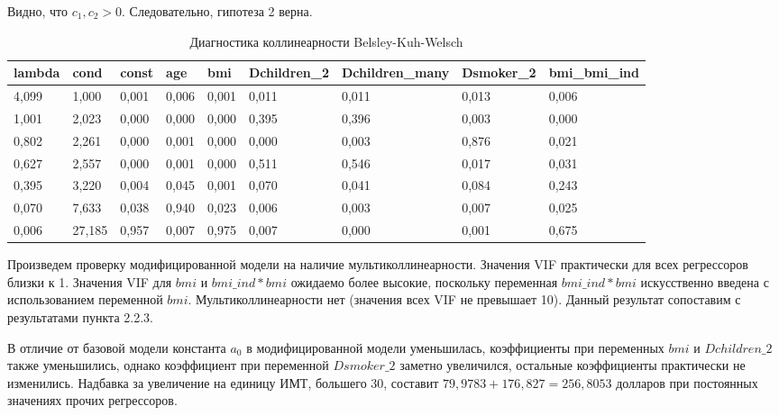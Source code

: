 \documentclass[a4paper,12pt]{article}
\begin{document}
Видно, что $c_1, c_2 >0$. Следовательно, гипотеза 2 верна.

\begin{table}[H]
	\begin{adjustbox}{width=\linewidth}
	\begin{tabular}{|l|l|l|l|l|l|l|l|l|}
		\hline
		lambda & cond   & const & age   & bmi   & Dchildren\_2 & Dchildren\_many & Dsmoker\_2 & bmi\_bmi\_ind \\ \hline
		4,099  & 1,000  & 0,001 & 0,006 & 0,001 & 0,011        & 0,011           & 0,013      & 0,006         \\ \hline
		1,001  & 2,023  & 0,000 & 0,000 & 0,000 & 0,395        & 0,396           & 0,003      & 0,000         \\ \hline
		0,802  & 2,261  & 0,000 & 0,001 & 0,000 & 0,000        & 0,003           & 0,876      & 0,021         \\ \hline
		0,627  & 2,557  & 0,000 & 0,001 & 0,000 & 0,511        & 0,546           & 0,017      & 0,031         \\ \hline
		0,395  & 3,220  & 0,004 & 0,045 & 0,001 & 0,070        & 0,041           & 0,084      & 0,243         \\ \hline
		0,070  & 7,633  & 0,038 & 0,940 & 0,023 & 0,006        & 0,003           & 0,007      & 0,025         \\ \hline
		0,006  & 27,185 & 0,957 & 0,007 & 0,975 & 0,007        & 0,000           & 0,001      & 0,675         \\ \hline
	\end{tabular}
\end{adjustbox}
\caption{Диагностика коллинеарности Belsley-Kuh-Welsch}
\label{tab:bmi-model_bkw}
\end{table}

Произведем проверку модифицированной модели на наличие мультиколлинеарности. Значения VIF практически для всех регрессоров близки к 1. Значения VIF для $bmi$ и $bmi\_ind * bmi$ ожидаемо более высокие, поскольку переменная $bmi\_ind * bmi$ искусственно введена с использованием переменной $bmi$. Мультиколлинеарности нет (значения всех VIF не превышает 10). Данный результат сопоставим с результатами пункта 2.2.3.

В отличие от базовой модели константа $a_0$ в модифицированной модели уменьшилась, коэффициенты при переменных $bmi$ и $Dchildren\_2$ также уменьшились, однако коэффициент при переменной $Dsmoker\_2$ заметно увеличился, остальные коэффициенты практически не изменились. Надбавка за увеличение на единицу ИМТ, большего 30, составит $79,9783 + 176,827 = 256,8053$ долларов при постоянных значениях прочих регрессоров.
\end{document}
